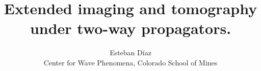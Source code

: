 

\newcommand*{\mytext}[2]{%
\noindent\color{#1!80}{%
\parbox{0.98\linewidth}{#2}}}%


\author{\textup{Esteban D\'{i}az}\\
Center for Wave Phenomena,  
Colorado School of Mines}

\title{Extended imaging and tomography under two-way propagators.}

\maketitle


\newif\ifreport
\reporttrue














